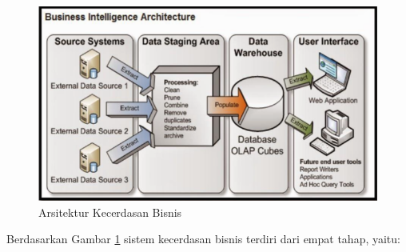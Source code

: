 \begin{figure}
\centering
\includegraphics[scale=0.5]{Gambar/arsitektur-kecerdasan-bisnis.png}
\caption[Arsitektur Kecerdasan Bisnis]{Arsitektur Kecerdasan Bisnis} 
\label{fig:arsitektur_kecerdasan_bisnis_fig}
\end{figure}

Berdasarkan Gambar \ref{fig:arsitektur_kecerdasan_bisnis_fig} sistem kecerdasan bisnis terdiri dari empat tahap, yaitu:

